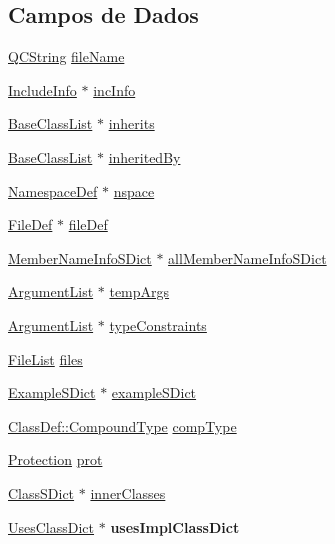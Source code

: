 \subsection*{Campos de Dados}
\begin{DoxyCompactItemize}
\item 
\hyperlink{class_q_c_string}{Q\-C\-String} \hyperlink{class_class_def_impl_abb9cd3e430c4eaf05aa259fa96f32305}{file\-Name}
\item 
\hyperlink{struct_include_info}{Include\-Info} $\ast$ \hyperlink{class_class_def_impl_a0cba66a9f6ffe861a51b9be202714bb2}{inc\-Info}
\item 
\hyperlink{class_base_class_list}{Base\-Class\-List} $\ast$ \hyperlink{class_class_def_impl_a8b9018b192f2f9004f8b058ba1d4d4ed}{inherits}
\item 
\hyperlink{class_base_class_list}{Base\-Class\-List} $\ast$ \hyperlink{class_class_def_impl_a2a84a13b04588770007b79363d29cd86}{inherited\-By}
\item 
\hyperlink{class_namespace_def}{Namespace\-Def} $\ast$ \hyperlink{class_class_def_impl_aca092109e90d350747ec9ccb7d4805c6}{nspace}
\item 
\hyperlink{class_file_def}{File\-Def} $\ast$ \hyperlink{class_class_def_impl_a2e1ae363ea84baa4340319bb5a163f25}{file\-Def}
\item 
\hyperlink{class_member_name_info_s_dict}{Member\-Name\-Info\-S\-Dict} $\ast$ \hyperlink{class_class_def_impl_aa8f99065fcaf7b17dadea395ff119e81}{all\-Member\-Name\-Info\-S\-Dict}
\item 
\hyperlink{class_argument_list}{Argument\-List} $\ast$ \hyperlink{class_class_def_impl_a132135b8994a03a68bf763c6055c5a4b}{temp\-Args}
\item 
\hyperlink{class_argument_list}{Argument\-List} $\ast$ \hyperlink{class_class_def_impl_adefae2de7d374d135863ba982399500d}{type\-Constraints}
\item 
\hyperlink{class_file_list}{File\-List} \hyperlink{class_class_def_impl_adbfe1e3c296fd762e9e717e0e83358e2}{files}
\item 
\hyperlink{class_example_s_dict}{Example\-S\-Dict} $\ast$ \hyperlink{class_class_def_impl_a7726dc36df5baed8960272489b15e599}{example\-S\-Dict}
\item 
\hyperlink{class_class_def_a768a6f0a6fd7e9087ff7971abbcc3f36}{Class\-Def\-::\-Compound\-Type} \hyperlink{class_class_def_impl_a78b7fb1883960e1a8935c4254e2de05b}{comp\-Type}
\item 
\hyperlink{types_8h_a90e352184df58cd09455fe9996cd4ded}{Protection} \hyperlink{class_class_def_impl_a3f887065f93ce5f02dea21da35468e8e}{prot}
\item 
\hyperlink{class_class_s_dict}{Class\-S\-Dict} $\ast$ \hyperlink{class_class_def_impl_af8c782281ef14751085df442d8f248c8}{inner\-Classes}
\item 
\hypertarget{class_class_def_impl_a10ec86dbc94e39b3f62c9232a31826d9}{\hyperlink{class_uses_class_dict}{Uses\-Class\-Dict} $\ast$ {\bfseries uses\-Impl\-Class\-Dict}}\label{class_class_def_impl_a10ec86dbc94e39b3f62c9232a31826d9}


\end{DoxyCompactItemize}
